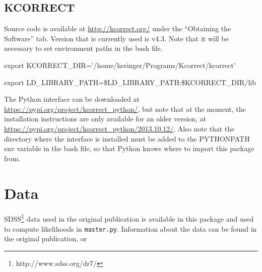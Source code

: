 \documentclass[manuscript]{aastex}
\begin{document}
\subsection{KCORRECT}
\label{seubsec:kcorrect}

Source code is available at \href{http://kcorrect.org/}{http://kcorrect.org/} under the ``Obtaining the Software'' tab. Version that is currently used is v4.3. Note that it will be necessary to set environment paths in the bash file.

export KCORRECT\_DIR='/home/heringer/Programs/Kcorrect/kcorrect'

export LD\_LIBRARY\_PATH=\$LD\_LIBRARY\_PATH:\$KCORRECT\_DIR/lib

The Python interface can be downloaded at \href{https://pypi.org/project/kcorrect\_python/}{https://pypi.org/project/kcorrect\_python/}, but note that at the moment, the installation instructions are only available for an older version, at \href{https://pypi.org/project/kcorrect\_python/2013.10.12/}{https://pypi.org/project/kcorrect\_python/2013.10.12/}. Also note that the directory where the interface is installed must be added to the PYTHONPATH env variable in the bash file, so that Python knows where to import this package from.

\section{Data}
\label{sec:data}
SDSS\footnote{http://www.sdss.org/dr7/} data used in the original publication \citep{Heringer2017_DTD} is
available in this package and used to compute likelihoods in \texttt{master.py}. Information about the data can be found in the original publication, \citet{Frieman2008_SNsurvey} or \citet{Sako2014_SNsurvey}



\end{document}
